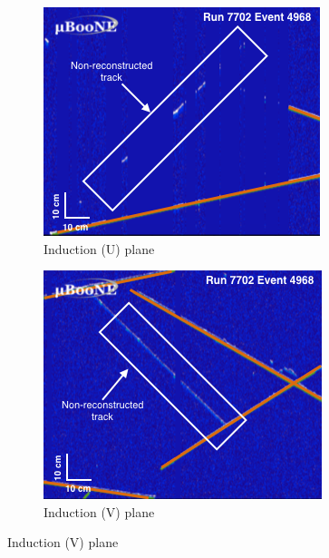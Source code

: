 \documentclass[a4paper,11pt]{article}
\begin{document}
\begin{figure}[htbp]
  \begin{center}
    \begin{subfigure}{0.3\textwidth}
      \includegraphics[width=\linewidth]{figures/u.png}
      \caption{Induction (U) plane} \label{fig:u}
    \end{subfigure}
    \begin{subfigure}{0.3\textwidth}
      \includegraphics[width=\linewidth]{figures/v.png}
      \caption{Induction (V) plane} \label{fig:v}
    \end{subfigure}

\end{center}
\end{figure}
\end{document}
